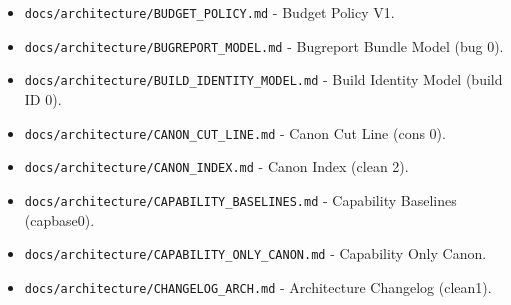 \documentclass[9pt,a4paper,openany]{book}
\begin{document}
\begin{itemize}
\item \texttt{docs/\allowbreak{}architecture/\allowbreak{}BUDGET\_\allowbreak{}POLICY.\allowbreak{}md} -\allowbreak{} Budget Policy V1.\allowbreak{}
\end{itemize}

\begin{itemize}
\item \texttt{docs/\allowbreak{}architecture/\allowbreak{}BUGREPORT\_\allowbreak{}MODEL.\allowbreak{}md} -\allowbreak{} Bugreport Bundle Model (bug 0).\allowbreak{}
\end{itemize}

\begin{itemize}
\item \texttt{docs/\allowbreak{}architecture/\allowbreak{}BUILD\_\allowbreak{}IDENTITY\_\allowbreak{}MODEL.\allowbreak{}md} -\allowbreak{} Build Identity Model (build ID 0).\allowbreak{}
\end{itemize}

\begin{itemize}
\item \texttt{docs/\allowbreak{}architecture/\allowbreak{}CANON\_\allowbreak{}CUT\_\allowbreak{}LINE.\allowbreak{}md} -\allowbreak{} Canon Cut Line (cons 0).\allowbreak{}
\end{itemize}

\begin{itemize}
\item \texttt{docs/\allowbreak{}architecture/\allowbreak{}CANON\_\allowbreak{}INDEX.\allowbreak{}md} -\allowbreak{} Canon Index (clean 2).\allowbreak{}
\end{itemize}

\begin{itemize}
\item \texttt{docs/\allowbreak{}architecture/\allowbreak{}CAPABILITY\_\allowbreak{}BASELINES.\allowbreak{}md} -\allowbreak{} Capability Baselines (capbase0).\allowbreak{}
\end{itemize}

\begin{itemize}
\item \texttt{docs/\allowbreak{}architecture/\allowbreak{}CAPABILITY\_\allowbreak{}ONLY\_\allowbreak{}CANON.\allowbreak{}md} -\allowbreak{} Capability Only Canon.\allowbreak{}
\end{itemize}

\begin{itemize}
\item \texttt{docs/\allowbreak{}architecture/\allowbreak{}CHANGELOG\_\allowbreak{}ARCH.\allowbreak{}md} -\allowbreak{} Architecture Changelog (clean1).\allowbreak{}
\end{itemize}
\end{document}
